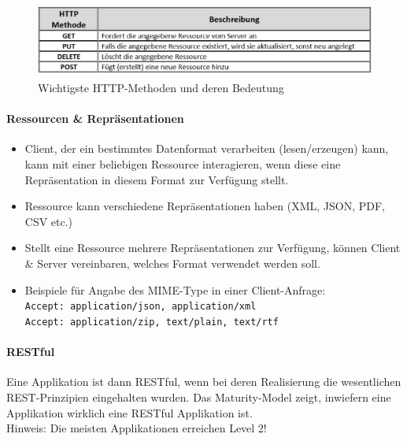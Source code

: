\documentclass[a4paper]{article}
\begin{document}
				\begin{figure}[!htb]
					\centering
					\includegraphics[keepaspectratio, height=2.5cm]{img/ws/http_methods.png}
					\caption{Wichtigste HTTP-Methoden und deren Bedeutung}
					\label{fig:http_methods}
				\end{figure}
			
			\paragraph{Ressourcen \& Repräsentationen}
			
				\begin{itemize}
					\item Client, der ein bestimmtes Datenformat verarbeiten (lesen/erzeugen) kann, kann mit einer beliebigen Ressource interagieren, wenn diese eine Repräsentation in diesem Format zur Verfügung stellt.
					\item Ressource kann verschiedene Repräsentationen haben (XML, JSON, PDF, CSV etc.)
					\item Stellt eine Ressource mehrere Repräsentationen zur Verfügung, können Client \& Server vereinbaren, welches Format verwendet werden soll.
					\item Beispiele für Angabe des MIME-Type in einer Client-Anfrage:\\
					\texttt{Accept: application/json, application/xml}\\
					\texttt{Accept: application/zip, text/plain, text/rtf}
				\end{itemize}
			
			\paragraph{RESTful}
			
			Eine Applikation ist dann RESTful, wenn bei deren Realisierung die wesentlichen REST-Prinzipien eingehalten wurden.
			Das Maturity-Model zeigt, inwiefern eine Applikation wirklich eine RESTful Applikation ist.\\
			Hinweis: Die meisten Applikationen erreichen Level 2!
			
\end{document}
